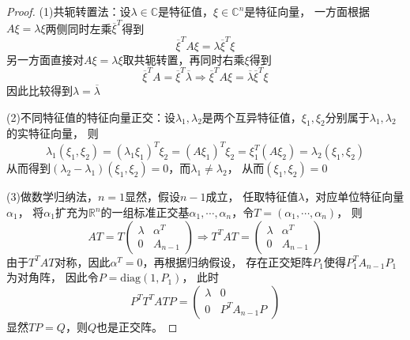 \begin{proof}
  (1)共轭转置法：设$\lambda \in \mathbb{C}$是特征值，$\xi \in \mathbb{C}^n$是特征向量，
  一方面根据$A\xi = \lambda \xi$两侧同时左乘$\overline{\xi}^T$得到
  \begin{equation*}
    \overline{\xi}^T A\xi = \lambda \overline{\xi}^T \xi 
  \end{equation*}
  另一方面直接对$A\xi = \lambda \xi$取共轭转置，再同时右乘$\xi$得到
  \begin{equation*}
    \overline{\xi}^T A = \overline{\xi}^T \overline{\lambda} \Rightarrow \overline{\xi}^T A \xi = \overline{\lambda} \overline{\xi}^T \xi
  \end{equation*}
  因此比较得到$\lambda = \overline{\lambda}$
  
  (2)不同特征值的特征向量正交：设$\lambda_1,\lambda_2$是两个互异特征值，$\xi_1,\xi_2$分别属于$\lambda_1,\lambda_2$的实特征向量，
  则
  \begin{equation*}
    \lambda_1(\xi_1,\xi_2) = (\lambda_1\xi_1)^T\xi_2 = (A\xi_1)^T\xi_2 = \xi^T_1(A\xi_2) = \lambda_2(\xi_1,\xi_2)
  \end{equation*}
  从而得到$(\lambda_2 - \lambda_1)(\xi_1,\xi_2) = 0$，而$\lambda_1 \neq \lambda_2$，
  从而$(\xi_1,\xi_2) = 0$

  (3)做数学归纳法，$n = 1$显然，假设$n - 1$成立，
  任取特征值$\lambda$，对应单位特征向量$\alpha_1$，
  将$\alpha_1$扩充为$\mathbb{R}^n$的一组标准正交基$\alpha_1,\cdots,\alpha_n$，令$T = (\alpha_1,\cdots,\alpha_n)$，
  则
  \begin{equation*}
    AT = T \left(
      \begin{array}{cc}
        \lambda&\alpha^T\\
        0&A_{n-1}
      \end{array}
    \right) \Rightarrow T^T AT = \left(
      \begin{array}{cc}
        \lambda&\alpha^T \\
               0&A_{n-1}
      \end{array}
    \right)
  \end{equation*}
  由于$T^TAT$对称，因此$\alpha^T = 0$，再根据归纳假设，
  存在正交矩阵$P_1$使得$P_1^TA_{n-1}P_1$为对角阵，
  因此令$P = \mathrm{diag}(1, P_1)$，
  此时
  \begin{equation*}
    P^TT^TATP = \left(
      \begin{array}{cc}
        \lambda&0\\
        0&P^TA_{n-1}P
      \end{array}
    \right)
  \end{equation*}
  显然$TP = Q$，则$Q$也是正交阵。
\end{proof}


